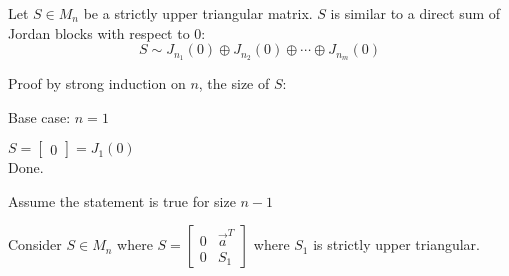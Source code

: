 \documentclass[letterpaper,12pt,fleqn]{article}
\newcommand{\va}{\vec{a}}
\begin{document}
\begin{lemma}
  Let $S\in M_n$ be a strictly upper triangular matrix. $S$ is similar to a direct sum of
  Jordan blocks with respect to $0$:
  \[S\sim J_{n_1}(0)\oplus J_{n_2}(0)\oplus\cdots\oplus J_{n_m}(0)\]
\end{lemma}

\begin{theproof}
  Proof by strong induction on $n$, the size of $S$:
  \begin{description}
  \item Base case: $n=1$

    $S=\begin{bmatrix} 0 \end{bmatrix}=J_1(0)$ \\
    Done.

  \item Assume the statement is true for size $n-1$

  \item Consider $S\in M_n$ where $S=\begin{bmatrix} 0 & \va^T \\ 0 & S_1 \end{bmatrix}$
    where $S_1$ is strictly upper triangular.


\end{description}
\end{theproof}
\end{document}

